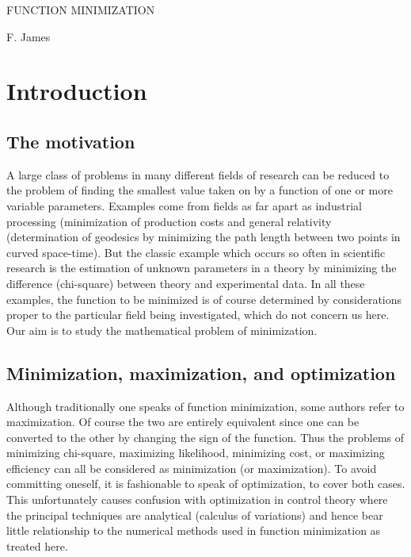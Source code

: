                 FUNCTION MINIMIZATION
 
 
 
                      F. James

\chapter{Introduction}
\section{The motivation}
A large class of problems in many different fields of research can
be reduced to the problem of finding the smallest value taken on by a
function of one or more variable parameters.  Examples come from fields
as far apart as industrial processing (minimization of production costs
and general relativity (determination of geodesics by minimizing the
path length between two points in curved space-time).  But the classic
example which occurs so often in scientific research is the estimation of
unknown parameters in a theory by minimizing the difference (chi-square)
between theory and experimental data.  In all these examples, the function
to be minimized is of course determined by considerations proper to
the particular field being investigated, which do not concern us here.
Our aim is to study the mathematical problem of minimization.
 
\section{Minimization, maximization, and optimization}
 
Although traditionally one speaks of function minimization, some
authors refer to maximization.  Of course the two are entirely equivalent
since one can be converted to the other by changing the sign of the function.
Thus the problems of minimizing chi-square, maximizing likelihood,
minimizing cost, or maximizing efficiency can all be considered as
minimization (or maximization).  To avoid committing oneself, it is
fashionable to speak of optimization, to cover both cases.  This
unfortunately causes confusion with optimization in control theory where
the principal techniques are analytical (calculus of variations) and
hence bear little relationship to the numerical methods used in function
minimization as treated here.
 
